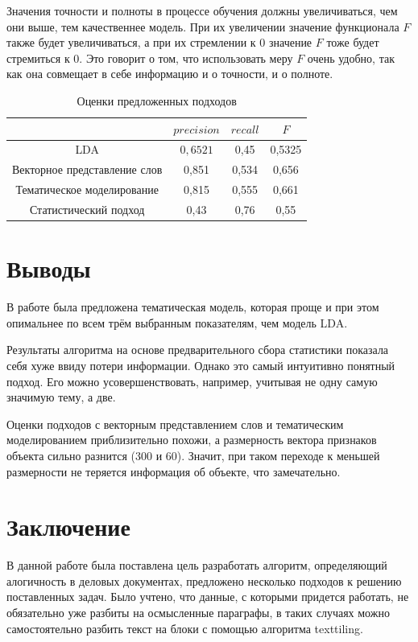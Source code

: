 \documentclass[12pt]{article}
\newcommand{\nextline}{\tabularnewline\hline}
\begin{document}
Значения точности и полноты в процессе обучения должны увеличиваться, чем они выше, тем качественнее модель. При их увеличении значение функционала $F$ также будет увеличиваться, а при их стремлении к $0$ значение $F$ тоже будет стремиться к $0$. Это говорит о том, что использовать меру $F$ очень удобно, так как она совмещает в себе информацию и о точности, и о полноте.

\begin{table}[h]
	\centering
	\vspace{-0.5cm}
	\caption{Оценки предложенных подходов}
	\vspace{0.2cm}
	\label{table3}
	\begin{tabular}{|c|c|c|c|}
		\hline
		& $precision$ & $recall$ & $F$      \nextline 
		LDA                          & $0,6521$    & 0,45   & 0,5325 \nextline 
		Векторное представление слов & 0,851     & 0,534  & 0,656  \nextline 
		Тематическое моделирование   & 0,815     & 0,555  & 0,661  \nextline 
		Статистический подход        & 0,43      & 0,76   & 0,55  \nextline
	\end{tabular}
\end{table}

\newpage

\section{Выводы}
В работе была предложена тематическая модель, которая проще и при этом опимальнее по всем трём выбранным показателям, чем модель LDA. 

Результаты алгоритма на основе предварительного сбора статистики показала себя хуже ввиду потери информации. Однако это самый интуитивно понятный подход. Его можно усовершенствовать, например, учитывая не одну самую значимую тему, а две.

Оценки подходов с векторным представлением слов и тематическим моделированием приблизительно похожи, а размерность вектора признаков объекта сильно разнится (300 и 60). Значит, при таком переходе к меньшей размерности не теряется информация об объекте, что замечательно.

\newpage
\section{Заключение}
В данной работе была поставлена цель разработать алгоритм, определяющий алогичность в деловых документах, предложено несколько подходов к решению поставленных задач. Было учтено, что данные, с которыми придется работать, не обязательно уже разбиты на осмысленные параграфы, в таких случаях можно самостоятельно разбить текст на блоки с помощью алгоритма texttiling. 
\end{document}
